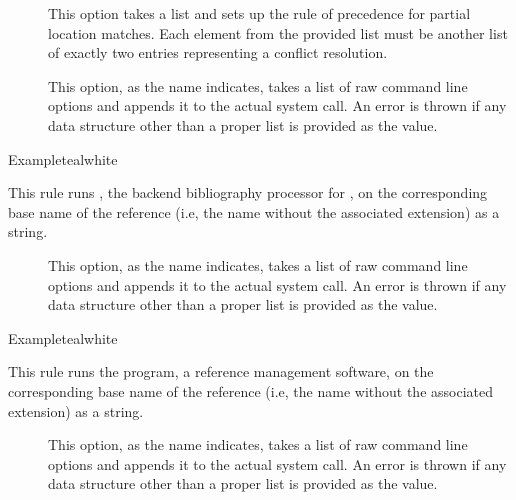 \begin{description}
\begin{description}
\item[] This option takes a list and sets up the rule of precedence for partial location matches. Each element from the provided list must be another list of exactly two entries representing a conflict resolution.

\item[] This option, as the name indicates, takes a list of raw command line options and appends it to the actual system call. An error is thrown if any data structure other than a proper list is provided as the value.
\end{description}

\begin{codebox}{Example}{teal}{\icnote}{white}
\end{codebox}

\item[\rulebox{biber}{Marco Daniel, Paulo Cereda}] This rule runs , the backend bibliography processor for , on the corresponding base name of the  reference (i.e, the name without the associated extension) as a string.

\begin{description}
\item[] This option, as the name indicates, takes a list of raw command line options and appends it to the actual system call. An error is thrown if any data structure other than a proper list is provided as the value.
\end{description}

\begin{codebox}{Example}{teal}{\icnote}{white}
\end{codebox}

\item[\rulebox{bibtex}{Marco Daniel, Paulo Cereda}] This rule runs the  program, a reference management software, on the corresponding base name of the  reference (i.e, the name without the associated extension) as a string.

\begin{description}
\item[] This option, as the name indicates, takes a list of raw command line options and appends it to the actual system call. An error is thrown if any data structure other than a proper list is provided as the value.
\end{description}


\end{description}
